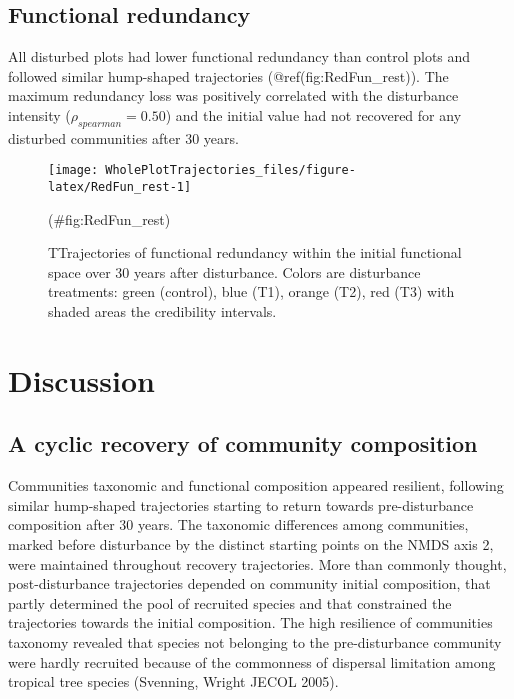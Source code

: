 \documentclass[fleqn,10pt]{ArtEcoFoG} %
\begin{document}
\subsection{Functional redundancy}\label{functional-redundancy}

All disturbed plots had lower functional redundancy than control plots
and followed similar hump-shaped trajectories (@ref(fig:RedFun\_rest)).
The maximum redundancy loss was positively correlated with the
disturbance intensity (\(\rho_{spearman}=0.50\)) and the initial value
had not recovered for any disturbed communities after 30 years.

\begin{figure}

{\centering \texttt{[image: WholePlotTrajectories\_files/figure-latex/RedFun\_rest-1]} 

}

\caption{TTrajectories of functional redundancy within the initial functional space over 30 years after disturbance. Colors are disturbance treatments: green (control), blue (T1), orange (T2), red (T3) with shaded areas the credibility intervals.}(\#fig:RedFun_rest)
\end{figure}

\section{Discussion}\label{discussion}

\subsection{A cyclic recovery of community
composition}\label{a-cyclic-recovery-of-community-composition}

Communities taxonomic and functional composition appeared resilient,
following similar hump-shaped trajectories starting to return towards
pre-disturbance composition after 30 years. The taxonomic differences
among communities, marked before disturbance by the distinct starting
points on the NMDS axis 2, were maintained throughout recovery
trajectories. More than commonly thought, post-disturbance trajectories
depended on community initial composition, that partly determined the
pool of recruited species and that constrained the trajectories towards
the initial composition. The high resilience of communities taxonomy
revealed that species not belonging to the pre-disturbance community
were hardly recruited because of the commonness of dispersal limitation
among tropical tree species (Svenning, Wright JECOL 2005).
\end{document}
